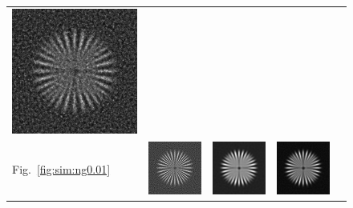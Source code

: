 \documentclass{./packages/optica-article}
\begin{document}
\begin{figure}
\begin{tabular}[t]{l c c c c}
		\includegraphics[scale=0.25]{Simulation deconvolution/ref_ng_0.1/RL_50.png}
		\\
		Fig.~\ref{fig:sim:ng0.01}                                                       &
		\includegraphics[scale=0.25]{Simulation deconvolution/ref_ng_0.01/RIF_0.01.png} &
		\includegraphics[scale=0.25]{Simulation deconvolution/ref_ng_0.01/RIF_1.png}    &
		\includegraphics[scale=0.25]{Simulation deconvolution/ref_ng_0.01/RL_10.png}    &

\end{tabular}
\end{figure}
\end{document}
